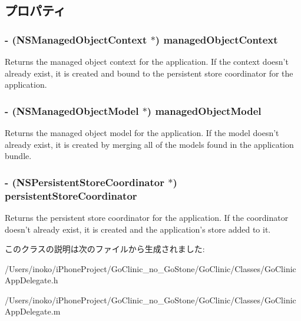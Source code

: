 \subsection{プロパティ}
\hypertarget{interface_go_clinic_app_delegate_a56340d41d4eb164878497e7b9ee3fcf6}{
\subsubsection[{managedObjectContext}]{\setlength{\rightskip}{0pt plus 5cm}-\/ (NSManagedObjectContext $\ast$) managedObjectContext}}
\label{interface_go_clinic_app_delegate_a56340d41d4eb164878497e7b9ee3fcf6}
Returns the managed object context for the application. If the context doesn't already exist, it is created and bound to the persistent store coordinator for the application. \hypertarget{interface_go_clinic_app_delegate_a83de9dbffc02726a241ab93c8a130ccf}{
\subsubsection[{managedObjectModel}]{\setlength{\rightskip}{0pt plus 5cm}-\/ (NSManagedObjectModel $\ast$) managedObjectModel}}
\label{interface_go_clinic_app_delegate_a83de9dbffc02726a241ab93c8a130ccf}
Returns the managed object model for the application. If the model doesn't already exist, it is created by merging all of the models found in the application bundle. \hypertarget{interface_go_clinic_app_delegate_acec743b348a53b0628186921e68af000}{
\subsubsection[{persistentStoreCoordinator}]{\setlength{\rightskip}{0pt plus 5cm}-\/ (NSPersistentStoreCoordinator $\ast$) persistentStoreCoordinator}}
\label{interface_go_clinic_app_delegate_acec743b348a53b0628186921e68af000}
Returns the persistent store coordinator for the application. If the coordinator doesn't already exist, it is created and the application's store added to it. 

このクラスの説明は次のファイルから生成されました:\begin{DoxyCompactItemize}
\item 
/Users/inoko/iPhoneProject/GoClinic\_\-no\_\-GoStone/GoClinic/Classes/GoClinicAppDelegate.h\item 
/Users/inoko/iPhoneProject/GoClinic\_\-no\_\-GoStone/GoClinic/Classes/GoClinicAppDelegate.m\end{DoxyCompactItemize}
